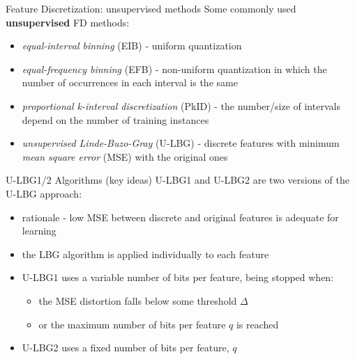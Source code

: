 \documentclass{beamer}
\begin{document}
\begin{frame}{Feature Discretization: unsupervised methods}
Some commonly used \textbf{unsupervised} FD methods:
\begin{itemize}
	\vfill
	\item \emph{equal-interval binning} (EIB) - uniform quantization 		
	
  \vfill
	\item \emph{equal-frequency binning} (EFB) - non-uniform quantization in which the number of 
	occurrences in each interval is the same
	
	\vfill
	\item \emph{proportional k-interval discretization} (PkID) - 
	the number/size of intervals depend on the number of training instances

  \vfill
	\item \emph{unsupervised Linde-Buzo-Gray} (U-LBG) - discrete features with minimum \emph{mean square error} (MSE) 
	with the original ones
\end{itemize}
\end{frame}


\begin{frame}{U-LBG1/2 Algorithms (key ideas)}
U-LBG1 and U-LBG2 are two versions of the U-LBG approach:
\begin{itemize}
	\vfill
	\item rationale - low MSE between discrete and original features is adequate for learning
	
	\vfill
	\item the LBG algorithm is applied individually to each feature 
	
	\vfill
	\item U-LBG1 uses a variable number of bits per feature, being stopped when:
	\begin{itemize}
		 \item the MSE distortion falls below some threshold $\Delta$
		 \item or the maximum number of bits per feature $q$ is reached
	\end{itemize}
  
  \vfill
  \item U-LBG2 uses a fixed number of bits per feature, $q$
\end{itemize}
\end{frame}
\end{document}
